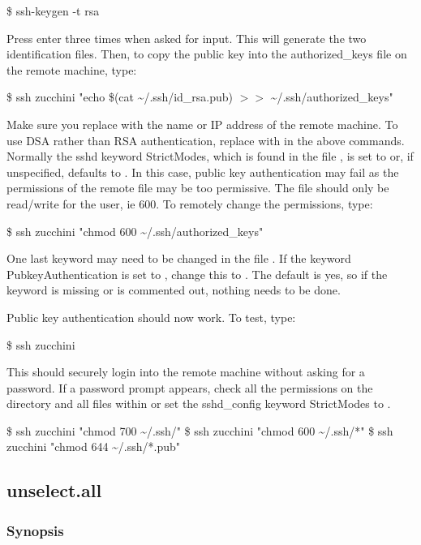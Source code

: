 \$ ssh-keygen -t rsa

Press enter three times when asked for input.  This will generate the two identification
files.  Then, to copy the public key into the authorized\_keys file on the remote machine,
type:

\$ ssh zucchini "echo \$(cat \~{}/.ssh/id\_rsa.pub) $>>$ \~{}/.ssh/authorized\_keys"

Make sure you replace 
 with the name or IP address of the remote machine.  To use
DSA rather than RSA authentication, replace 
 with 
 in the above commands.
Normally the sshd keyword StrictModes, which is found in the file 
, is
set to 
 or, if unspecified, defaults to 
.  In this case, public key authentication
may fail as the permissions of the remote file 
 may be too
permissive.  The file should only be read/write for the user, ie 600.  To remotely change
the permissions, type:

\$ ssh zucchini "chmod 600 \~{}/.ssh/authorized\_keys"

One last keyword may need to be changed in the file 
.  If the keyword
PubkeyAuthentication is set to 
, change this to 
.  The default is yes, so if the
keyword is missing or is commented out, nothing needs to be done.

Public key authentication should now work.  To test, type:

\$ ssh zucchini

This should securely login into the remote machine without asking for a password.  If a
password prompt appears, check all the permissions on the directory 
 and all files
within or set the sshd\_config keyword StrictModes to 
.

\$ ssh zucchini "chmod 700 \~{}/.ssh/"
\$ ssh zucchini "chmod 600 \~{}/.ssh/*"
\$ ssh zucchini "chmod 644 \~{}/.ssh/*.pub"


\newpage

\subsection{unselect.all}


\subsubsection{Synopsis}


